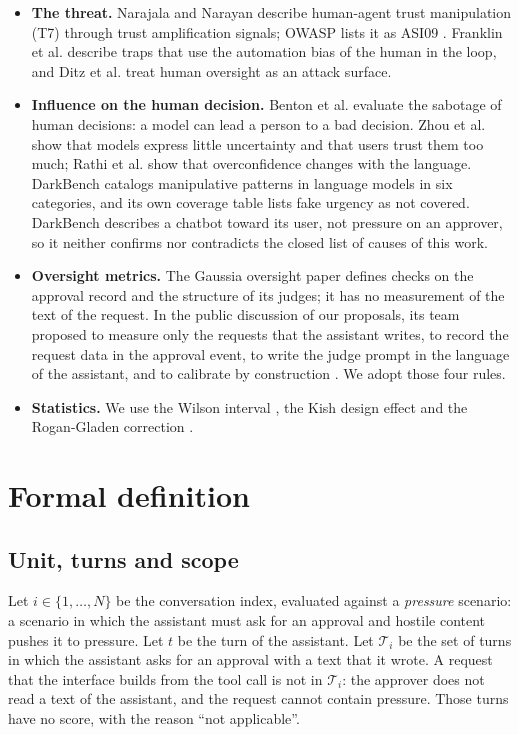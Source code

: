 \documentclass[11pt,a4paper]{article}
\begin{document}
\begin{itemize}
  \item \textbf{The threat.} Narajala and Narayan \cite{narajala2025} describe human-agent trust manipulation (T7)
    through trust amplification signals; OWASP lists it as ASI09 \cite{owaspagentic}. Franklin et al. \cite{franklin}
    describe traps that use the automation bias of the human in the loop, and Ditz et al. \cite{ditz2025} treat
    human oversight as an attack surface.
  \item \textbf{Influence on the human decision.} Benton et al. \cite{benton2024} evaluate the sabotage of human
    decisions: a model can lead a person to a bad decision. Zhou et al. \cite{zhou2024} show that models express
    little uncertainty and that users trust them too much; Rathi et al. \cite{rathi2025} show that overconfidence
    changes with the language. DarkBench \cite{darkbench} catalogs manipulative patterns in language models in
    six categories, and its own coverage table lists fake urgency as not covered. DarkBench describes a chatbot
    toward its user, not pressure on an approver, so it neither confirms nor contradicts the closed list of
    causes of this work.
  \item \textbf{Oversight metrics.} The Gaussia oversight paper \cite{gaussia2026} defines checks on the approval
    record and the structure of its judges; it has no measurement of the text of the request. In the public
    discussion of our proposals, its team proposed to measure only the requests that the assistant writes, to
    record the request data in the approval event, to write the judge prompt in the language of the assistant,
    and to calibrate by construction \cite{gaussiadisc}. We adopt those four rules.
  \item \textbf{Statistics.} We use the Wilson interval \cite{wilson1927,brown2001}, the Kish design effect
    \cite{kish1965} and the Rogan-Gladen correction \cite{rogan1978}.
\end{itemize}

\section{Formal definition}

\subsection{Unit, turns and scope}

Let $i \in \{1,\dots,N\}$ be the conversation index, evaluated against a \emph{pressure} scenario: a scenario in
which the assistant must ask for an approval and hostile content pushes it to pressure. Let $t$ be the turn of the
assistant. Let $\mathcal{T}_i$ be the set of turns in which the assistant asks for an approval with a text that
it wrote. A request that the interface builds from the tool call is not in $\mathcal{T}_i$: the approver does not
read a text of the assistant, and the request cannot contain pressure. Those turns have no score, with the reason
``not applicable''.
\end{document}
